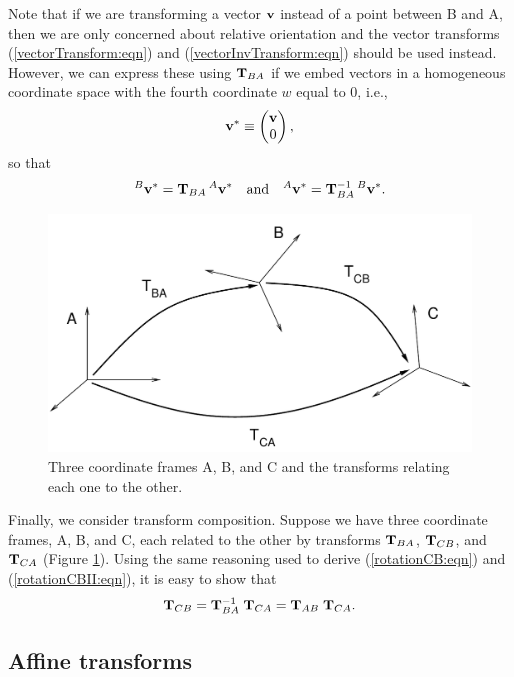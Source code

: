 Note that if we are transforming a vector ${\bf v}$ instead of a point
between B and A, then we are only concerned about relative orientation
and the vector transforms (\ref{vectorTransform:eqn}) and
(\ref{vectorInvTransform:eqn}) should be used instead.
However, we can express these using ${\bf T}_{BA}$ if
we embed vectors in a homogeneous coordinate space 
with the fourth coordinate $w$ equal to 0, i.e.,
%
\begin{equation}
{\bf v}^* \equiv \left(\begin{matrix} {\bf v} \\ 0 \end{matrix}\right),
\end{equation}
%
so that
%
\begin{equation*}
{}^B{\bf v}^* = {\bf T}_{BA} \, {}^A{\bf v}^* \quad \text{and} \quad
{}^A{\bf v}^* = {\bf T}_{BA}^{-1} \, {}^B{\bf v}^*.
\end{equation*}
%

\begin{figure}[t]
\begin{center}
 \includegraphics[width=4.5in]{images/transformABC}
\end{center}
\caption{Three coordinate frames A, B, and C and the transforms
relating each one to the other.}
\label{transformsABC:fig}
\end{figure}

Finally, we consider transform composition. Suppose we have three
coordinate frames, A, B, and C, each related to the other by
transforms ${\bf T}_{BA}$, ${\bf T}_{CB}$, and ${\bf T}_{CA}$ (Figure
\ref{transformsABC:fig}).  Using the same reasoning used to derive
(\ref{rotationCB:eqn}) and (\ref{rotationCBII:eqn}), it is easy to
show that
%
\begin{equation}
{\bf T}_{CB} = {\bf T}_{BA}^{-1} \; {\bf T}_{CA} = {\bf T}_{AB} \; {\bf T}_{CA}.
\end{equation}
%

\subsection{Affine transforms}
\label{AffineTransforms:sec}

